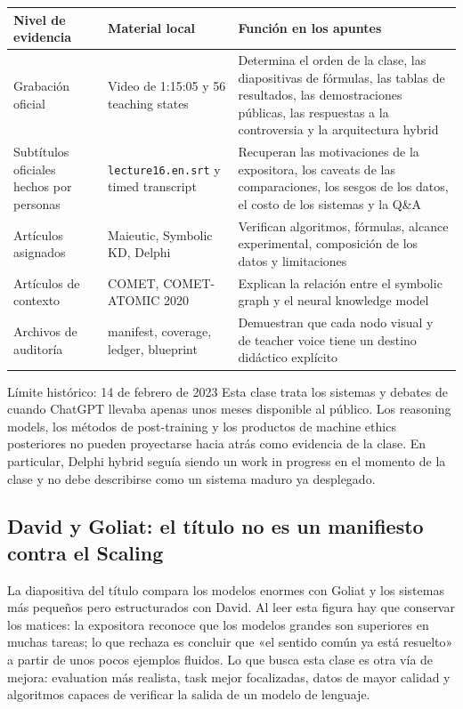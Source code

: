 \begin{longtable}{@{}L{0.18\textwidth}L{0.27\textwidth}L{0.43\textwidth}@{}}
\toprule
Nivel de evidencia & Material local & Función en los apuntes \\
\midrule
Grabación oficial & Video de 1:15:05 y 56 teaching states & Determina el orden de la clase, las diapositivas de fórmulas, las tablas de resultados, las demostraciones públicas, las respuestas a la controversia y la arquitectura hybrid \\
Subtítulos oficiales hechos por personas & \texttt{lecture16.en.srt} y timed transcript & Recuperan las motivaciones de la expositora, los caveats de las comparaciones, los sesgos de los datos, el costo de los sistemas y la Q\&A \\
Artículos asignados & Maieutic, Symbolic KD, Delphi & Verifican algoritmos, fórmulas, alcance experimental, composición de los datos y limitaciones \\
Artículos de contexto & COMET, COMET-ATOMIC 2020 & Explican la relación entre el symbolic graph y el neural knowledge model \\
Archivos de auditoría & manifest, coverage, ledger, blueprint & Demuestran que cada nodo visual y de teacher voice tiene un destino didáctico explícito \\
\bottomrule
\end{longtable}

\begin{warningbox}{Límite histórico: 14 de febrero de 2023}
Esta clase trata los sistemas y debates de cuando ChatGPT llevaba apenas unos meses disponible al público. Los reasoning models, los métodos de post-training y los productos de machine ethics posteriores no pueden proyectarse hacia atrás como evidencia de la clase. En particular, Delphi hybrid seguía siendo un work in progress en el momento de la clase y no debe describirse como un sistema maduro ya desplegado.
\end{warningbox}

\subsection{David y Goliat: el título no es un manifiesto contra el Scaling}

La diapositiva del título compara los modelos enormes con Goliat y los sistemas más pequeños pero estructurados con David. Al leer esta figura hay que conservar los matices: la expositora reconoce que los modelos grandes son superiores en muchas tareas; lo que rechaza es concluir que «el sentido común ya está resuelto» a partir de unos pocos ejemplos fluidos. Lo que busca esta clase es otra vía de mejora: evaluation más realista, task mejor focalizadas, datos de mayor calidad y algoritmos capaces de verificar la salida de un modelo de lenguaje.

